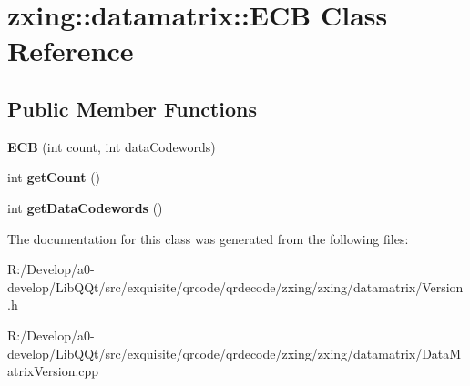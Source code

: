 \hypertarget{classzxing_1_1datamatrix_1_1_e_c_b}{}\section{zxing\+:\+:datamatrix\+:\+:E\+CB Class Reference}
\label{classzxing_1_1datamatrix_1_1_e_c_b}
\subsection*{Public Member Functions}
\begin{DoxyCompactItemize}
\item 
\mbox{\label{classzxing_1_1datamatrix_1_1_e_c_b_a7bc0cac8f8b43f581f7cc51b153b8ff3}} 
{\bfseries E\+CB} (int count, int data\+Codewords)
\item 
\mbox{\label{classzxing_1_1datamatrix_1_1_e_c_b_aea5330ee1984136cc0b8cb6e1d042898}} 
int {\bfseries get\+Count} ()
\item 
\mbox{\label{classzxing_1_1datamatrix_1_1_e_c_b_a17f3d08585d7aeaf717d9210eda2f7d6}} 
int {\bfseries get\+Data\+Codewords} ()
\end{DoxyCompactItemize}


The documentation for this class was generated from the following files\+:\begin{DoxyCompactItemize}
\item 
R\+:/\+Develop/a0-\/develop/\+Lib\+Q\+Qt/src/exquisite/qrcode/qrdecode/zxing/zxing/datamatrix/Version.\+h\item 
R\+:/\+Develop/a0-\/develop/\+Lib\+Q\+Qt/src/exquisite/qrcode/qrdecode/zxing/zxing/datamatrix/Data\+Matrix\+Version.\+cpp\end{DoxyCompactItemize}
